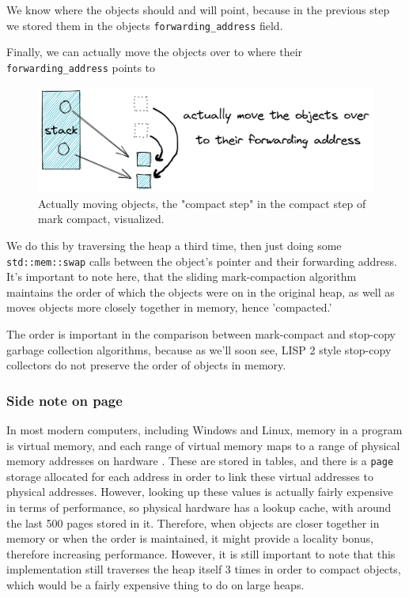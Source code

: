 \documentclass[index]{subfiles}
\begin{document}
We know where the objects should and will point, because in the previous step we stored them in the objects \verb+forwarding_address+ field.

Finally, we can actually move the objects over to where their \verb+forwarding_address+ points to

\begin{figure}[H]
    \centering
    \includegraphics[scale=0.3]{pics/actually-move.png}
    \caption{Actually moving objects, the "compact step" in the compact step of mark compact, visualized.}
\end{figure}

We do this by traversing the heap a third time, then just doing some \texttt{std::mem::swap} calls between the object's pointer and their forwarding address. It's important to note here, that the sliding mark-compaction algorithm maintains the order of which the objects were on in the original heap, as well as moves objects more closely together in memory, hence 'compacted.'

The order is important in the comparison between mark-compact and stop-copy garbage collection algorithms, because as we'll soon see, LISP 2 style stop-copy collectors do not preserve the order of objects in memory.

\subsubsection{Side note on page}

In most modern computers, including Windows and Linux, memory in a program is virtual memory, and each range of virtual memory maps to a range of physical memory addresses on hardware \cite{code_project}. These are stored in tables, and there is a \verb+page+ storage allocated for each address in order to link these virtual addresses to physical addresses. However, looking up these values is actually fairly expensive in terms of performance, so physical hardware has a lookup cache, with around the last 500 pages stored in it. Therefore, when objects are closer together in memory or when the order is maintained, it might provide a locality bonus, therefore increasing performance. However, it is still important to note that this implementation still traverses the heap itself 3 times in order to compact objects, which would be a fairly expensive thing to do on large heaps.
\end{document}
